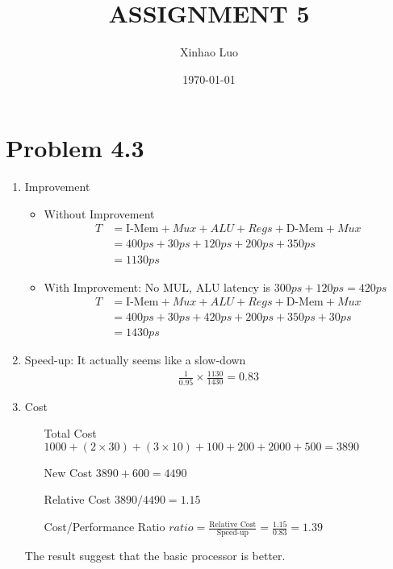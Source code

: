 \documentclass{article}
\title{\bf \Large ASSIGNMENT 5}
\author{Xinhao Luo}
\date{\today}
\def\math#1{$#1$}
\begin{document}
\maketitle
\medskip

\section{Problem 4.3}
\begin{enumerate}[1)]
    \item Improvement 
    \begin{itemize}
        \item Without Improvement
          \begin{equation}
            \begin{split}
                T &= \text{I-Mem} + Mux + ALU + Regs + \text{D-Mem} + Mux\\
                &= 400ps + 30ps + 120ps + 200ps + 350ps \\
                &= 1130ps
            \end{split}
          \end{equation}
        \item With Improvement: No MUL, ALU latency is \math{300ps + 120ps = 420ps}
            \begin{equation}
            \begin{split}
                T &= \text{I-Mem} + Mux + ALU + Regs + \text{D-Mem} + Mux \\
                &= 400ps + 30ps + 420ps + 200ps + 350ps + 30ps \\
                &= 1430ps
            \end{split}
          \end{equation}
    \end{itemize}
    \item Speed-up: It actually seems like a slow-down
    \begin{equation}
        \begin{split}
            \frac{1}{0.95} \times \frac{1130}{1430} = 0.83
        \end{split}
    \end{equation}
    \item Cost
        \begin{itemize}
            \item [Total Cost] \math{1000 + (2 \times 30) + (3 \times 10) + 100 + 200 + 2000 + 500 = 3890}
            \item [New Cost] \math{3890 + 600 = 4490}
            \item [Relative Cost] \math{3890 / 4490 = 1.15}
            \item [Cost/Performance Ratio] \math{ratio = \frac{\text{Relative Cost}}{\text{Speed-up}} = \frac{1.15}{0.83} = 1.39}
        \end{itemize}
        The result suggest that the basic processor is better.
\end{enumerate}
\end{document}
